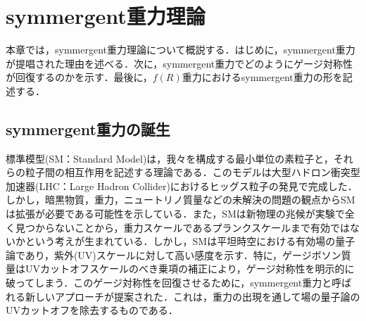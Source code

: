 \chapter{symmergent重力理論}
本章では，symmergent重力理論について概説する．はじめに，symmergent重力が提唱された理由を述べる．次に，symmergent重力でどのようにゲージ対称性が回復するのかを示す．最後に，$f(R)$重力におけるsymmergent重力の形を記述する．
\cite{DeFelice:2010aj,Sotiriou:2008rp,Charmousis:2008kc,Bamba:2015uma,Nojiri:2017ncd}
\section{symmergent重力の誕生}
\cite{Cimdiker:2021cpz,Pantig:2022qak,Pulice:2023dqw,Demir:2021moq,Bostan:2023hjp,Rayimbaev:2022hca,Demir:2019imw,Ali:2023dku,Sakharov:1967nyk,Cimdiker:2020enx}
標準模型(SM：Standard Model)は，我々を構成する最小単位の素粒子と，それらの粒子間の相互作用を記述する理論である．このモデルは大型ハドロン衝突型加速器(LHC：Large Hadron Collider)におけるヒッグス粒子の発見で完成した．しかし，暗黒物質，重力，ニュートリノ質量などの未解決の問題の観点からSMは拡張が必要である可能性を示している．また，SMは新物理の兆候が実験で全く見つからないことから，重力スケールであるプランクスケールまで有効ではないかという考えが生まれている．しかし，SMは平坦時空における有効場の量子論であり，紫外(UV)スケールに対して高い感度を示す．特に，ゲージボソン質量はUVカットオフスケールのべき乗項の補正により，ゲージ対称性を明示的に破ってしまう．このゲージ対称性を回復させるために，symmergent重力と呼ばれる新しいアプローチが提案された．これは，重力の出現を通して場の量子論のUVカットオフを除去するものである．

